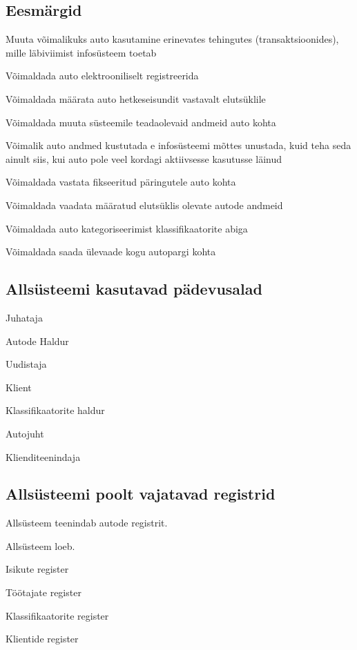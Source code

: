 \subsection{Eesmärgid}
\begin{myitemize}
	\item Muuta võimalikuks auto kasutamine erinevates tehingutes (transaktsioonides), mille läbiviimist infosüsteem toetab
	\item Võimaldada auto elektrooniliselt registreerida
	\item Võimaldada määrata auto hetkeseisundit vastavalt elutsüklile
	\item Võimaldada muuta süsteemile teadaolevaid andmeid auto kohta
	\item Võimalik auto andmed kustutada e infosüsteemi mõttes unustada, kuid teha seda ainult siis, kui auto pole veel kordagi aktiivsesse kasutusse läinud
	\item Võimaldada vastata fikseeritud päringutele auto kohta
	\item Võimaldada vaadata määratud elutsüklis olevate autode andmeid
	\item Võimaldada auto kategoriseerimist klassifikaatorite abiga
	\item Võimaldada saada ülevaade kogu autopargi kohta
\end{myitemize}

\subsection{Allsüsteemi kasutavad pädevusalad}
\begin{myitemize}
	\item Juhataja
	\item Autode Haldur
	\item Uudistaja
	\item Klient
	\item Klassifikaatorite haldur
	\item Autojuht
	\item Klienditeenindaja
\end{myitemize}

\subsection{Allsüsteemi poolt vajatavad registrid}
Allsüsteem teenindab autode registrit.
\\
\par
Allsüsteem loeb.
\begin{myitemize}
	\item Isikute register
	\item Töötajate register
	\item Klassifikaatorite register
	\item Klientide register
\end{myitemize}

